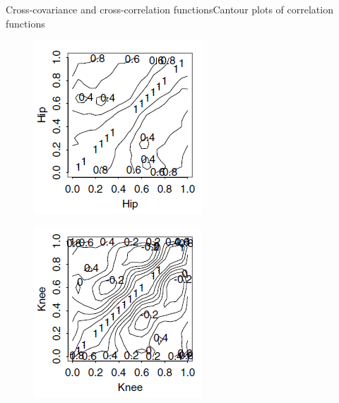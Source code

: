 \documentclass{beamer}
\begin{document}
\begin{frame}{Cross-covariance and cross-correlation functions}{Cantour plots of correlation functions}
	\begin{multicols}{2}
		\begin{figure}[h] %
			\begin{center}
				\includegraphics[width=0.9\linewidth]{img/6.png}
			\end{center}
			\label{fig:long}
			\label{fig:onecol}
		\end{figure}
		\begin{figure}[h] %
			\begin{center}
				\includegraphics[width=0.9\linewidth]{img/7.png}

\end{center}
\end{figure}
\end{multicols}
\end{frame}
\end{document}
